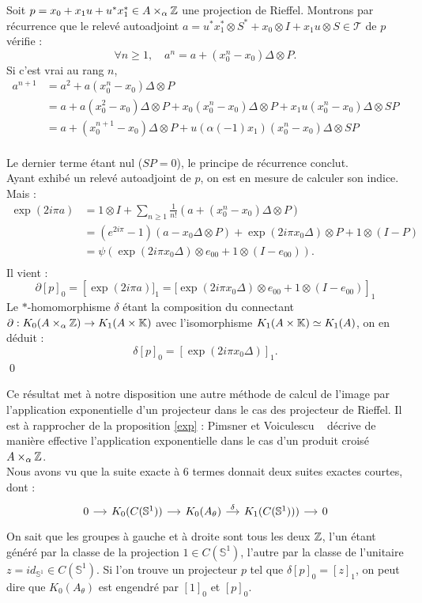 \begin{dem}
Soit $p=x_0+x_1 u +u^*x_1^*\in A\times_\alpha \mathbb Z $ une projection de Rieffel. Montrons par récurrence que le relevé autoadjoint $a=u^*x_1^*\otimes S^*+x_0\otimes I +x_1 u\otimes S\in \mathcal T$ de $p$ vérifie :
\[\forall n \geq 1, \quad a^n = a+(x_0^n-x_0)\Delta\otimes P.\]
Si c'est vrai au rang $n$,\\
\begin{align*}
a^{n+1} &=a^2+a(x_0^n-x_0)\Delta\otimes P \\
		& =a+a(x_0^2-x_0)\Delta\otimes P+x_0(x_0^n-x_0)\Delta\otimes P+x_1u(x_0^n-x_0)\Delta\otimes SP \\
		& = a+(x_0^{n+1}-x_0)\Delta\otimes P+ u(\alpha(-1)x_1)(x_0^n-x_0)\Delta\otimes SP\\
\end{align*}

Le dernier terme étant nul ($SP=0$), le principe de récurrence conclut.\\

Ayant exhibé un relevé autoadjoint de $p$, on est en mesure de calculer son indice. Mais :
\begin{align*}
\exp(2i\pi a ) &=1\otimes I+\sum_{n\geq 1}\frac{1}{n!}( a+(x_0^n-x_0)\Delta\otimes P)\\
		& = (e^{2i\pi}-1)(a-x_0\Delta \otimes P)+\exp(2i\pi x_0\Delta)\otimes P + 1\otimes (I-P)\\
		& =\psi\left(\exp(2i\pi x_0\Delta)\otimes e_{00} + 1\otimes (I-e_{00})\right).\\
\end{align*}
Il vient : 
\[\partial [p]_0=\left[\exp(2i\pi a )]_1=[\exp(2i\pi x_0\Delta)\otimes e_{00} + 1\otimes (I-e_{00}) \right]_1\]
Le $*$-homomorphisme $\delta$ étant la composition du connectant $\partial : K_0(A\times_\alpha \mathbb Z)\rightarrow K_1(A\times \mathbb K)$ avec l'isomorphisme $K_1(A\times \mathbb K)\simeq K_1(A)$, on en déduit :
\[\delta[p]_0=[\exp(2i\pi x_0\Delta)]_1.\]
\qed
\end{dem}

Ce résultat met à notre disposition une autre méthode de calcul de l'image par l'application exponentielle d'un projecteur dans le cas des projecteur de Rieffel. Il est à rapprocher de la proposition \ref{exp} : Pimsner et Voiculescu ~\cite{PV} décrive de manière effective l'application exponentielle dans le cas d'un produit croisé $A\times _\alpha \mathbb Z$.\\

Nous avons vu que la suite exacte à $6$ termes donnait deux suites exactes courtes, dont :
\[\begin{tikzcd}[column sep = small]0\arrow{r} & K_0(C(\mathbb S^1))\arrow{r}& K_0(A_\theta)\arrow{r}{\delta} & K_1(C(\mathbb S^1)))\arrow{r} & 0   \end{tikzcd}\]
On sait que les groupes à gauche et à droite sont tous les deux $\mathbb Z$, l'un étant généré par la classe de la projection $1\in C(\mathbb S^1)$, l'autre par la classe de l'unitaire $z=id_{\mathbb S^1}\in  C(\mathbb S^1)$. Si l'on trouve un projecteur $p$ tel que $\delta [p]_0=[z]_1$, on peut dire que $K_0(A_\theta)$ est engendré par $[1]_0$ et $[p]_0$.\\

